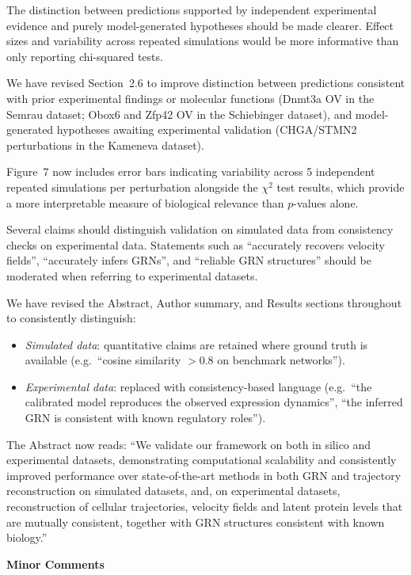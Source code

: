 \documentclass[11pt,a4paper]{article}
\newcounter{revtotal}   %
\newcounter{revlocal}   %
\newcommand{\currentreviewer}{}  %
\newcommand{\revcomment}[2]{%
  \stepcounter{revtotal}%
  \stepcounter{revlocal}%
  \edef\commentlabel{\currentreviewer.\arabic{revlocal}}%
  \begin{tcolorbox}[revstyle,
      title={\commentlabel\ $|$\ #1}]
    #2
  \end{tcolorbox}%
  \edef\lastcommentlabel{\commentlabel}%
}
\newcommand{\response}[1]{%
  \begin{tcolorbox}[respstyle,
      title={Response to \lastcommentlabel}]
    #1
  \end{tcolorbox}%
}
\newcommand{\subsect}[1]{%
  \vspace{0.8em}%
  {\normalsize\bfseries\color{revblue} #1}%
  \vspace{0.3em}\par%
}
\begin{document}
\revcomment{Perturbation predictions should be more cautiously interpreted}{%
The distinction between predictions supported by independent experimental evidence and
purely model-generated hypotheses should be made clearer. Effect sizes and variability
across repeated simulations would be more informative than only reporting chi-squared
tests.}
\response{%
We have revised Section~2.6 to improve distinction between predictions consistent with prior experimental findings or molecular functions (Dnmt3a OV in the Semrau dataset; Obox6 and Zfp42 OV in the Schiebinger dataset), and model-generated hypotheses awaiting experimental validation (CHGA/STMN2 perturbations in the Kameneva dataset).

Figure~7 now includes error bars indicating variability across 5 independent repeated simulations per perturbation alongside the $\chi^2$ test results, which provide a more interpretable measure of biological relevance than $p$-values alone.}

\revcomment{Claims moderation}{%
Several claims should distinguish validation on simulated data from consistency checks on
experimental data. Statements such as ``accurately recovers velocity fields'', ``accurately
infers GRNs'', and ``reliable GRN structures'' should be moderated when referring to
experimental datasets.}
\response{%
We have revised the Abstract, Author summary, and Results sections throughout to consistently
distinguish:
\begin{itemize}
  \item \textit{Simulated data}: quantitative claims are retained where ground truth is
        available (e.g.\ ``cosine similarity $>0.8$ on benchmark networks'').
  \item \textit{Experimental data}: replaced with consistency-based language (e.g.\ ``the calibrated model reproduces the observed expression dynamics'', ``the inferred
        GRN is consistent with known regulatory roles'').
\end{itemize}
The Abstract now reads: ``We validate our framework on both in silico and experimental datasets, demonstrating computational scalability and consistently improved performance over state-of-the-art methods in both GRN and trajectory reconstruction on simulated datasets, and, on experimental datasets, reconstruction of cellular trajectories, velocity fields and latent protein levels that are mutually consistent, together with GRN structures consistent with known biology.''}

\subsect{Minor Comments}
\end{document}
